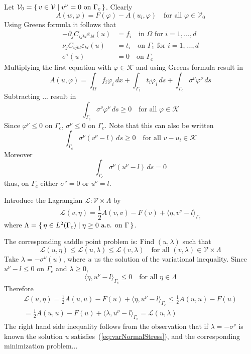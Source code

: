 \documentclass[12pt,a4paper]{article}
\numberwithin{equation}{section}
\numberwithin{table}{section}
\numberwithin{figure}{section}
\newcommand{\half}{\ensuremath{\frac{1}{2}}}
\newcommand{\pd}[1]{\ensuremath{\partial_{#1}}}
\renewcommand{\dj}{\pd{j}}
\newcommand{\V}{\ensuremath{\mathcal{V}}}
\newcommand{\K}{\ensuremath{\mathcal{K}}}
\newcommand{\Lagrange}{\ensuremath{\mathcal L}}
\newcommand{\intO}{\int_\Omega\!\!}
\newcommand{\intG}[1][0]{\int_{\Gamma_{#1}}\!\!}
\newcommand{\intGc}{\intG[c]}
\renewcommand{\epsilon}{\varepsilon}
\renewcommand{\phi}{\varphi}
\newcommand{\strain}[1][]{\ensuremath{\epsilon_{#1}}}
\newcommand{\epskl}{\strain[kl]}
\providecommand{\dualp}[2]{\langle #1, #2 \rangle}
\newcommand{\dx}{{\,dx}}
\newcommand{\ds}{{\,ds}}
\renewcommand{\forall}{\text{for all }}
\newcommand{\qforall}{\quad\text{for all }}
\begin{document}
Let $\V_0 = \set{v\in \V | v^\nu = 0 \text{ on }\Gamma_c}$. Clearly
\begin{equation}
  A(w,\phi) = F(\phi) - A(u_l, \phi) \quad\forall{\phi\in\V_0}
\end{equation}
Using Greens formula it follows that
\begin{align}
  \label{eq:elasteq}
  -\dj C_{ijkl}\epskl(u) &= f_i \quad\text{in $\Omega$ for $i=1,\ldots,d$} \\
  \nu_j C_{ijkl}\epskl(u) &= t_i \quad\text{on $\Gamma_1$ for $i=1,\ldots,d$} \\
  \sigma^\tau(u) &= 0 \quad\text{on $\Gamma_c$}
\end{align}
Multiplying the first equation with $\phi\in \K$ and using Greens formula result in
\begin{equation}
  A(u,\phi) = \intO f_i \phi_i\dx + \intG[1] t_i \phi_i \ds
  + \intGc \sigma^\nu \phi^\nu \ds
\end{equation}
Subtracting ... result in 
\begin{equation}
  \intGc \sigma^\nu \phi^\nu \ds \ge 0 \qforall \phi\in\K
\end{equation}
Since $\phi^\nu\le 0$ on $\Gamma_c$, $\sigma^\nu \le 0$ on $\Gamma_c$. Note that this can
also be written
\begin{equation}
  \intGc \sigma^\nu (v^\nu-l) \ds \ge 0 \qforall v-u_l\in\K
\end{equation}
Moreover
\begin{equation}
  \intGc \sigma^\nu (u^\nu - l) \ds = 0
\end{equation}
thus, on $\Gamma_c$ either $\sigma^\nu = 0$ or $u^\nu = l$.

Introduce the Lagrangian $\Lagrange:\V\times \Lambda$ by
\begin{equation}
  \Lagrange(v,\eta) = \half A(v,v) - F(v) + \dualp{\eta}{v^\nu-l}_{\Gamma_c}
\end{equation}
where $\Lambda=\set{\eta\in L^2(\Gamma_c) | \eta \ge 0 \text{ a.e. on }\Gamma}$.

The corresponding saddle point problem is: Find $(u,\lambda)$ such that
\begin{equation}
  \Lagrange(u,\eta) \le \Lagrange(u,\lambda) \le \Lagrange(v,\lambda)
  \qforall (v,\lambda) \in \V\times\Lambda
\end{equation}
Take $\lambda = -\sigma^\nu(u)$, where $u$ us the solution of the variational inequality.
Since $u^\nu -l \le 0$ on $\Gamma_c$ and $\lambda \ge 0$,
\begin{equation}
  \dualp{\eta}{u^\nu - l}_{\Gamma_c} \le 0 \qforall \eta\in \Lambda
\end{equation}
Therefore
\begin{multline}
  \Lagrange(u,\eta) = \half A(u,u) - F(u) + \dualp{\eta}{u^\nu - l}_{\Gamma_c}
  \le \half A(u,u) - F(u) \\
  = \half A(u,u) - F(u) + \dualp{\lambda}{u^\nu - l}_{\Gamma_c}
  = \Lagrange(u,\lambda)
\end{multline}
The right hand side inequality follows from the observation that if $\lambda=-\sigma^\nu$
is known the solution $u$ satisfies~(\ref{eq:varNormalStress}), and the corresponding
minimization problem...
\end{document}
